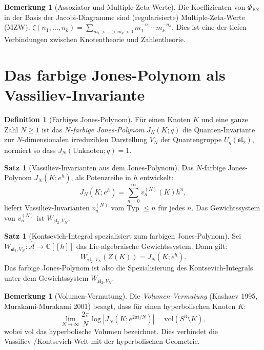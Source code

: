 \documentclass[12pt,a4paper]{amsart}
\theoremstyle{definition}
\newtheorem{satz}[theorem]{Satz}
\newtheorem{bemerkung}[theorem]{Bemerkung}
\newtheorem{definition_de}[theorem]{Definition}
\newcommand{\C}{\mathbb{C}}
\begin{document}
\begin{bemerkung}[Assoziator und Multiple-Zeta-Werte]
Die Koeffizienten von $\Phi_{\mathrm{KZ}}$ in der Basis der Jacobi-Diagramme
sind (regularisierte) Multiple-Zeta-Werte (MZW):
$\zeta(n_1, \ldots, n_k) = \sum_{m_1 > \cdots > m_k > 0} m_1^{-n_1} \cdots m_k^{-n_k}$.
Dies ist eine der tiefen Verbindungen zwischen Knotentheorie und Zahlentheorie.
\end{bemerkung}

\section{Das farbige Jones-Polynom als Vassiliev-Invariante}\label{sec:jones}

\begin{definition_de}[Farbiges Jones-Polynom]
Für einen Knoten $K$ und eine ganze Zahl $N \geq 1$ ist das
\emph{$N$-farbige Jones-Polynom} $J_N(K; q)$ die Quanten-Invariante
zur $N$-dimensionalen irreduziblen Darstellung $V_N$ der Quantengruppe
$U_q(\mathfrak{sl}_2)$, normiert so dass
$J_N(\text{Unknoten}; q) = 1$.
\end{definition_de}

\begin{satz}[Vassiliev-Invarianten aus dem Jones-Polynom]
\label{satz:jones_vassiliev}
Das $N$-farbige Jones-Polynom $J_N(K;e^h)$, als Potenzreihe in $h$
entwickelt:
\[
  J_N(K; e^h) = \sum_{n=0}^\infty v_n^{(N)}(K) h^n,
\]
liefert Vassiliev-Invarianten $v_n^{(N)}$ vom Typ $\leq n$ für jedes $n$.
Das Gewichtssystem von $v_n^{(N)}$ ist $W_{\mathfrak{sl}_2, V_N}$.
\end{satz}

\begin{satz}[Kontsevich-Integral spezialisiert zum farbigen Jones-Polynom]
\label{satz:KI_jones}
Sei $W_{\mathfrak{sl}_2, V_N}: \hat{\mathcal{A}} \to \C[[h]]$ das
Lie-algebraische Gewichtssystem.  Dann gilt:
\[
  W_{\mathfrak{sl}_2, V_N}(Z(K)) = J_N(K; e^h).
\]
Das farbige Jones-Polynom ist also die Spezialisierung des Kontsevich-Integrals
unter dem Gewichtssystem $W_{\mathfrak{sl}_2, V_N}$.
\end{satz}

\begin{bemerkung}[Volumen-Vermutung]
Die \emph{Volumen-Vermutung} (Kashaev 1995, Murakami-Murakami 2001) besagt,
dass für einen hyperbolischen Knoten $K$:
\[
  \lim_{N \to \infty} \frac{2\pi}{N} \log|J_N(K; e^{2\pi i/N})| = \mathrm{vol}(S^3 \setminus K),
\]
wobei $\mathrm{vol}$ das hyperbolische Volumen bezeichnet.  Dies verbindet
die Vassiliev-/Kontsevich-Welt mit der hyperbolischen Geometrie.
\end{bemerkung}
\end{document}
